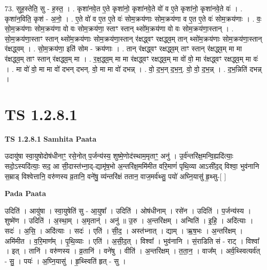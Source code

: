 \documentclass[17pt]{extarticle}
\begin{document}
73. सुह॒स्तेति॒ सु - ह॒स्त॒ । . कृशा॑नवे॒त ए॒ते कृशा॑नो॒ कृशा॑नवे॒ते वो॑ व ए॒ते कृशा॑नो॒ कृशा॑नवे॒ते वः॑ । . कृशा॑न॒विति॒ कृश॑ - अ॒नो॒ । . ए॒ते वो॑ व ए॒त ए॒ते वः॑ सोम॒क्रय॑णाः सोम॒क्रय॑णा व ए॒त ए॒ते वः॑ सोम॒क्रय॑णाः । . वः॒ सो॒म॒क्रय॑णाः सोम॒क्रय॑णा वो वः सोम॒क्रय॑णा॒ स्ताꣳ स्तान् थ्सो॑म॒क्रय॑णा वो वः सोम॒क्रय॑णा॒स्तान् । . सो॒म॒क्रय॑णा॒स्ताꣳ स्तान् थ्सो॑म॒क्रय॑णाः सोम॒क्रय॑णा॒स्तान् र॑क्षद्ध्वꣳ रक्षद्ध्व॒म् तान् थ्सो॑म॒क्रय॑णाः सोम॒क्रय॑णा॒स्तान् र॑क्षद्ध्वम् । . सो॒म॒क्रय॑णा॒ इति॑ सोम - क्रय॑णाः । . तान् र॑क्षद्ध्वꣳ रक्षद्ध्व॒म् ताꣳ स्तान् र॑क्षद्ध्व॒म् मा मा र॑क्षद्ध्व॒म् ताꣳ स्तान् र॑क्षद्ध्व॒म् मा । . र॒क्ष॒द्ध्व॒म् मा मा र॑क्षद्ध्वꣳ रक्षद्ध्व॒म् मा वो॑ वो॒ मा र॑क्षद्ध्वꣳ रक्षद्ध्व॒म् मा वः॑ । . मा वो॑ वो॒ मा मा वो॑ दभन् दभन्. वो॒ मा मा वो॑ दभन्न् । . वो॒ द॒भ॒न् द॒भ॒न्॒. वो॒ वो॒ द॒भ॒न्न् । . द॒भ॒न्निति॑ दभन्न् । \newline
\pagebreak
{}

\section{ TS 1.2.8.1 }

\textbf{TS 1.2.8.1 } \newline
\textbf{Samhita Paata} \newline

उदायु॑षा स्वा॒युषोदोष॑धीनाꣳ॒॒ रसे॒नोत् प॒र्जन्य॑स्य॒ शुष्मे॒णोद॑स्थाम॒मृताꣳ॒॒ अनु॑ । उ॒र्व॑न्तरि॑क्ष॒मन्वि॒ह्यदि॑त्याः॒ सदो॒ऽस्यदि॑त्याः॒ सद॒ आ सी॒दास्त॑भ्ना॒द्-द्यामृ॑ष॒भो अ॒न्तरि॑क्ष॒ममि॑मीत वरि॒माणं॑ पृथि॒व्या आऽसी॑द॒द् विश्वा॒ भुव॑नानि स॒म्राड् विश्वेत्तानि॒ वरु॑णस्य व्र॒तानि॒ वने॑षु॒ व्य॑न्तरि॑क्षं ततान॒ वाज॒मर्व॑थ्सु॒ पयो॑ अघ्नि॒यासु॑ हृ॒थ्सु-[ ] \newline

\textbf{Pada Paata} \newline

उदिति॑ । आयु॑षा । स्वा॒युषेति॑ सु - आ॒युषा᳚ । उदिति॑ । ओष॑धीनाम् । रसे॑न । उदिति॑ । प॒र्जन्य॑स्य । शुष्मे॑ण । उदिति॑ । अ॒स्था॒म् । अ॒मृतान्॑ । अनु॑ ॥ उ॒रु । अ॒न्तरि॑क्षम् । अन्विति॑ । इ॒हि॒ । अदि॑त्याः । सदः॑ । अ॒सि॒ । अदि॑त्याः । सदः॑ । एति॑ । सी॒द॒ । अस्त॑भ्नात् । द्याम् । ऋ॒ष॒भः । अ॒न्तरि॑क्षम् । अमि॑मीत । व॒रि॒माण᳚म् । पृ॒थि॒व्याः । एति॑ । अ॒सी॒द॒त् । विश्वा᳚ । भुव॑नानि । सं॒राडिति सं - राट् । विश्वा᳚ । इत् । तानि॑ । वरु॑णस्य । व्र॒तानि॑ । वने॑षु । वीति॑ । अ॒न्तरि॑क्षम् । त॒ता॒न॒ । वाज᳚म् । अर्व॒थ्स्वित्यर्व॑त् - सु॒ । पयः॑ । अ॒घ्नि॒यासु॑ । हृ॒थ्स्विति॑ हृत् - सु ।  \newline
\end{document}
